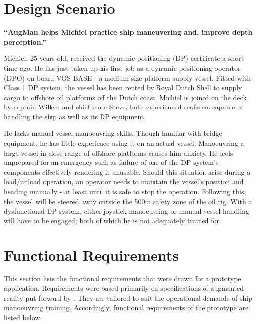 \section{Design Scenario}

\textbf{“AugMan helps Michiel practice ship maneuvering and, improve depth perception.”}

Michiel, 25 years old, received the dynamic positioning (DP) certificate a short time ago. He has just taken up his first job as a dynamic positioning operator (DPO) on-board VOS BASE - a medium-size platform supply vessel. Fitted with Class 1 DP system, the vessel has been rented by Royal Dutch Shell to supply cargo to offshore oil platforms off the Dutch coast. Michiel is joined on the deck by captain Willem and chief mate Steve, both experienced seafarers capable of handling the ship as well as its DP equipment.

He lacks manual vessel manoeuvring skills. Though familiar with bridge equipment, he has little experience using it on an actual vessel. Manoeuvring a large vessel in close range of offshore platforms causes him anxiety. He feels unprepared for an emergency such as failure of one of the DP system's components effectively rendering it unusable. Should this situation arise during a load/unload operation, an operator needs to maintain the vessel's position and heading manually - at least until it is safe to stop the operation. Following this, the vessel will be steered away outside the 500m safety zone of the oil rig. With a dysfunctional DP system, either joystick manoeuvring or manual vessel handling will have to be engaged; both of which he is not adequately trained for. 

\section{Functional Requirements}
\label{sec:functionalreqs}
This section lists the functional requirements that were drawn for a prototype application. Requirements were based primarily on specifications of augmented reality put forward by \cite{azuma1997survey}. They are tailored to suit the operational demands of ship manoeuvring training. Accordingly, functional requirements of the prototype are listed below.\\

